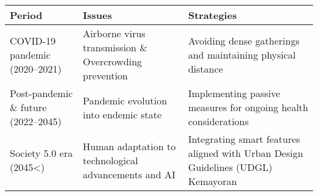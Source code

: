 \begin{table}[H]
	\renewcommand{\arraystretch}{3}
	\RaggedRight
	\small
	\begin{tabularx}{\linewidth}{p{1.5cm} X X}
		\textbf{Period}                      & \textbf{Issues}                                        & \textbf{Strategies}                                                              \\
		\midrule
		COVID-19 pandemic (2020--2021)       & Airborne virus transmission \& Overcrowding prevention & Avoiding dense gatherings and maintaining physical distance                      \\
		\midrule
		Post-pandemic \& future (2022--2045) & Pandemic evolution into endemic state                  & Implementing passive measures for ongoing health considerations                  \\
		\midrule
		Society 5.0 era (2045<)              & Human adaptation to technological advancements and AI  & Integrating smart features aligned with Urban Design Guidelines (UDGL) Kemayoran \\
	\end{tabularx}
\end{table}
